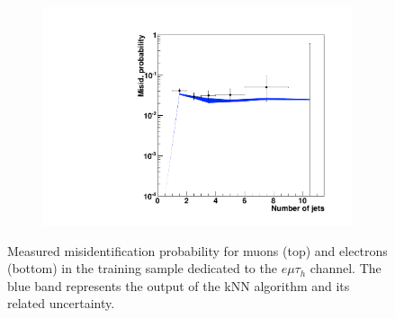 \begin{figure}
\begin{subfigure}[b]{0.33\textwidth}
                \includegraphics[width=\textwidth]{4_Analisys/pics/8TeV/plots/fakerates/e_emt_kNN_numJets20.pdf}
                \caption{}
        \end{subfigure}
        \caption{Measured misidentification probability for muons (top) and electrons (bottom) in the training sample dedicated to the $e\mu\tau_h$ channel. The blue band represents the output of the kNN algorithm and its related uncertainty.}\label{fig:fake_rate_emt}
\end{figure}

